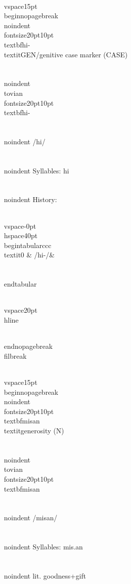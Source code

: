 \\vspace{15pt}
\\begin{nopagebreak}
\\noindent{\\fontsize{20pt}{10pt}\\textbf{hi-} } \\textit{GEN/genitive case marker} (CASE)\\\\
\\noindent {\\tovian \\fontsize{20pt}{10pt} \\textbf{hi-} }\\\\
\\noindent /h{\textprimstress}i/\\\\
\\noindent Syllables: hi\\\\


\\noindent History:

\\vspace{-0pt}
\\hspace{40pt}
\\begin{tabular}{ccc}
\\textit{0} & /hi-/& \\\\
\\end{tabular}

\\vspace{20pt}\\hline

\\end{nopagebreak}
\\filbreak



\\vspace{15pt}
\\begin{nopagebreak}
\\noindent{\\fontsize{20pt}{10pt}\\textbf{misan} } \\textit{generosity} (N)\\\\
\\noindent {\\tovian \\fontsize{20pt}{10pt} \\textbf{misan} }\\\\
\\noindent /m{\textprimstress}isan/\\\\
\\noindent Syllables: mis.an\\\\
\\noindent lit. goodness+gift\\\\


